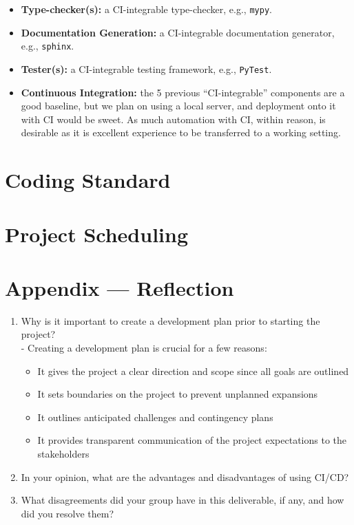 \documentclass{article}
\begin{document}
\begin{itemize}
    \item \textbf{Type-checker(s):} a CI-integrable type-checker, e.g., \texttt{mypy}.
    \item \textbf{Documentation Generation:} a CI-integrable documentation generator, e.g., \texttt{sphinx}.
    \item \textbf{Tester(s):} a CI-integrable testing framework, e.g., \texttt{PyTest}.
    \item \textbf{Continuous Integration:} the 5 previous ``CI-integrable'' components are a good baseline, but we plan on using a local server, and deployment onto it with CI would be sweet. As much automation with CI, within reason, is desirable as it is excellent experience to be transferred to a working setting.
\end{itemize}

\section{Coding Standard}

\section{Project Scheduling}


\newpage{}

\section*{Appendix --- Reflection}




\begin{enumerate}
    \item Why is it important to create a development plan prior to starting the
    project?\\
    - Creating a development plan is crucial for a few reasons:
    \begin{itemize}
      \item It gives the project a clear direction and scope since all goals are outlined
      \item It sets boundaries on the project to prevent unplanned expansions
      \item It outlines anticipated challenges and contingency plans
      \item It provides transparent communication of the project expectations to the stakeholders
    \end{itemize}
    \item In your opinion, what are the advantages and disadvantages of using
    CI/CD?
    \item What disagreements did your group have in this deliverable, if any,
    and how did you resolve them?
\end{enumerate}
\end{document}
